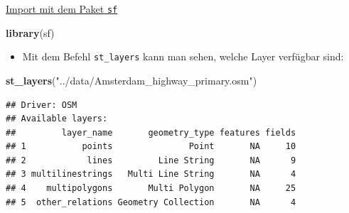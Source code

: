 \documentclass[ignorenonframetext,]{beamer}
\newenvironment{Shaded}{\begin{snugshade}}{\end{snugshade}}
\newcommand{\KeywordTok}[1]{\textcolor[rgb]{0.13,0.29,0.53}{\textbf{#1}}}
\newcommand{\StringTok}[1]{\textcolor[rgb]{0.31,0.60,0.02}{#1}}
\newcommand{\NormalTok}[1]{#1}
\providecommand{\tightlist}{%
  \setlength{\itemsep}{0pt}\setlength{\parskip}{0pt}}
\begin{document}
\begin{frame}[fragile]{\href{https://cran.r-project.org/web/packages/sf/vignettes/sf2.html}{Import
mit dem Paket \texttt{sf}}}

\begin{Shaded}
\begin{Highlighting}[]
\KeywordTok{library}\NormalTok{(sf)}
\end{Highlighting}
\end{Shaded}

\begin{itemize}
\tightlist
\item
  Mit dem Befehl \texttt{st\_layers} kann man sehen, welche Layer
  verfügbar sind:
\end{itemize}

\begin{Shaded}
\begin{Highlighting}[]
\KeywordTok{st_layers}\NormalTok{(}\StringTok{"../data/Amsterdam_highway_primary.osm"}\NormalTok{)}
\end{Highlighting}
\end{Shaded}

\begin{verbatim}
## Driver: OSM 
## Available layers:
##         layer_name       geometry_type features fields
## 1           points               Point       NA     10
## 2            lines         Line String       NA      9
## 3 multilinestrings   Multi Line String       NA      4
## 4    multipolygons       Multi Polygon       NA     25
## 5  other_relations Geometry Collection       NA      4
\end{verbatim}

\end{frame}
\end{document}
